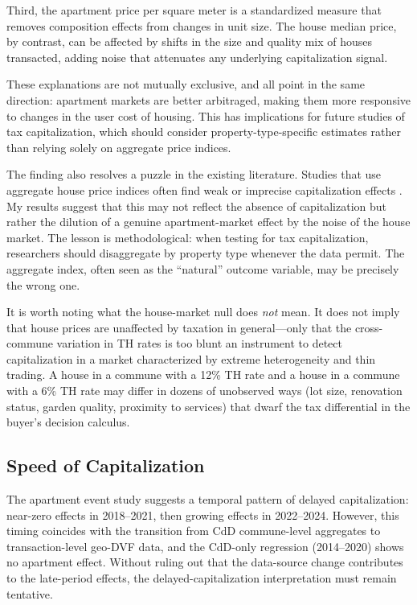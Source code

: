 \documentclass[12pt]{article}
\begin{document}
Third, the apartment price per square meter is a standardized measure that removes composition effects from changes in unit size. The house median price, by contrast, can be affected by shifts in the size and quality mix of houses transacted, adding noise that attenuates any underlying capitalization signal.

These explanations are not mutually exclusive, and all point in the same direction: apartment markets are better arbitraged, making them more responsive to changes in the user cost of housing. This has implications for future studies of tax capitalization, which should consider property-type-specific estimates rather than relying solely on aggregate price indices.

The finding also resolves a puzzle in the existing literature. Studies that use aggregate house price indices often find weak or imprecise capitalization effects \citep{hilber2017impact}. My results suggest that this may not reflect the absence of capitalization but rather the dilution of a genuine apartment-market effect by the noise of the house market. The lesson is methodological: when testing for tax capitalization, researchers should disaggregate by property type whenever the data permit. The aggregate index, often seen as the ``natural'' outcome variable, may be precisely the wrong one.

It is worth noting what the house-market null does \emph{not} mean. It does not imply that house prices are unaffected by taxation in general---only that the cross-commune variation in TH rates is too blunt an instrument to detect capitalization in a market characterized by extreme heterogeneity and thin trading. A house in a commune with a 12\% TH rate and a house in a commune with a 6\% TH rate may differ in dozens of unobserved ways (lot size, renovation status, garden quality, proximity to services) that dwarf the tax differential in the buyer's decision calculus.

\subsection{Speed of Capitalization}

The apartment event study suggests a temporal pattern of delayed capitalization: near-zero effects in 2018--2021, then growing effects in 2022--2024. However, this timing coincides with the transition from CdD commune-level aggregates to transaction-level geo-DVF data, and the CdD-only regression (2014--2020) shows no apartment effect. Without ruling out that the data-source change contributes to the late-period effects, the delayed-capitalization interpretation must remain tentative.
\end{document}
